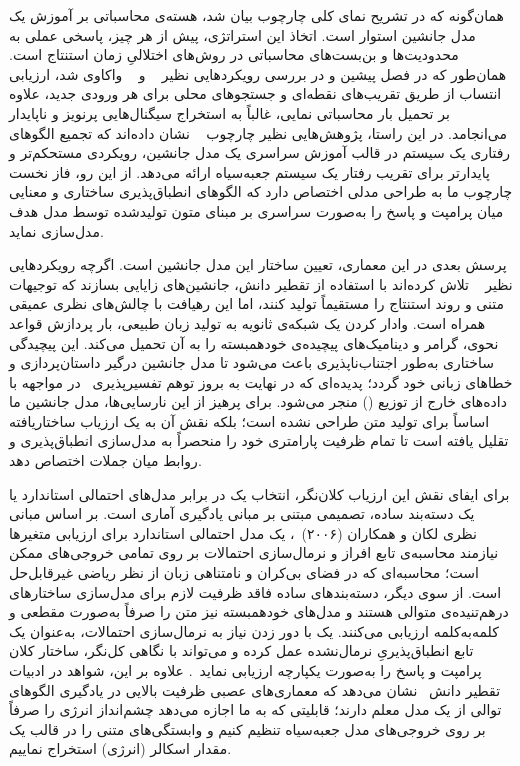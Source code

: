 همان‌گونه که در تشریح نمای کلی چارچوب بیان شد، هسته‌ی محاسباتی  بر آموزش یک مدل جانشین استوار است. اتخاذ این استراتژی، پیش از هر چیز، پاسخی عملی به محدودیت‌ها و بن‌بست‌های محاسباتی در روش‌های اختلالیِ زمان استنتاج است. همان‌طور که در فصل پیشین و در بررسی رویکردهایی نظیر ~\cite{chen2018learning} و ~\cite{seyyedsalehi2024sointer} واکاوی شد، ارزیابی انتساب از طریق تقریب‌های نقطه‌ای و جستجوهای محلی برای هر ورودی جدید، علاوه بر تحمیل بار محاسباتی نمایی، غالباً به استخراج سیگنال‌هایی پرنویز و ناپایدار می‌انجامد. در این راستا، پژوهش‌هایی نظیر چارچوب ~\cite{li2025fromexplainability} نشان داده‌اند که تجمیع الگوهای رفتاری یک سیستم در قالب آموزش سراسری یک مدل جانشین، رویکردی مستحکم‌تر و پایدارتر برای تقریب رفتار یک سیستم جعبه‌سیاه ارائه می‌دهد. از این رو، فاز نخست چارچوب ما به طراحی مدلی اختصاص دارد که الگوهای انطباق‌پذیری ساختاری و معنایی میان پرامپت و پاسخ را به‌صورت سراسری بر مبنای متون تولیدشده توسط مدل هدف مدل‌سازی نماید.

پرسش بعدی در این معماری، تعیین ساختار این مدل جانشین است. اگرچه رویکردهایی نظیر ~\cite{jiang2024trisum} تلاش کرده‌اند با استفاده از تقطیر دانش، جانشین‌های زایایی بسازند که توجیهات متنی و روند استنتاج را مستقیماً تولید کنند، اما این رهیافت با چالش‌های نظری عمیقی همراه است. وادار کردن یک شبکه‌ی ثانویه به تولید زبان طبیعی، بار پردازش قواعد نحوی، گرامر و دینامیک‌های پیچیده‌ی خودهمبسته را به آن تحمیل می‌کند. این پیچیدگی ساختاری به‌طور اجتناب‌ناپذیری باعث می‌شود تا مدل جانشین درگیر داستان‌پردازی و خطاهای زبانی خود گردد؛ پدیده‌ای که در نهایت به بروز توهم تفسیرپذیری~\cite{friedman2024interpretability} در مواجهه با داده‌های خارج از توزیع () منجر می‌شود. برای پرهیز از این نارسایی‌ها، مدل جانشین ما اساساً برای تولید متن طراحی نشده است؛ بلکه نقش آن به یک ارزیاب ساختاریافته تقلیل یافته است تا تمام ظرفیت پارامتری خود را منحصراً به مدل‌سازی انطباق‌پذیری و روابط میان جملات اختصاص دهد.

برای ایفای نقش این ارزیاب کلان‌نگر، انتخاب یک  در برابر مدل‌های احتمالی استاندارد یا یک دسته‌بند ساده، تصمیمی مبتنی بر مبانی یادگیری آماری است. بر اساس مبانی نظری لکان و همکاران (۲۰۰۶)~\cite{lecun2006tutorial}، یک مدل احتمالی استاندارد برای ارزیابی متغیرها نیازمند محاسبه‌ی تابع افراز و نرمال‌سازی احتمالات بر روی تمامی خروجی‌های ممکن است؛ محاسبه‌ای که در فضای بی‌کران و نامتناهی زبان از نظر ریاضی غیرقابل‌حل است. از سوی دیگر، دسته‌بندهای ساده فاقد ظرفیت لازم برای مدل‌سازی ساختارهای درهم‌تنیده‌ی متوالی هستند و مدل‌های خودهمبسته نیز متن را صرفاً به‌صورت مقطعی و کلمه‌به‌کلمه ارزیابی می‌کنند. یک  با دور زدن نیاز به نرمال‌سازی احتمالات، به‌عنوان یک تابع انطباق‌پذیریِ نرمال‌نشده عمل کرده و می‌تواند با نگاهی کل‌نگر، ساختار کلان پرامپت و پاسخ را به‌صورت یکپارچه ارزیابی نماید~\cite{bakhtin2019realfake, deng2020residual, bakhtin2021residual, bhattacharyya2021reranking, qin2022cold, xu2025energybased}. علاوه بر این، شواهد در ادبیات تقطیر دانش~\cite{gu2021fully} نشان می‌دهد که معماری‌های عصبی ظرفیت بالایی در یادگیری الگوهای توالی از یک مدل معلم دارند؛ قابلیتی که به ما اجازه می‌دهد چشم‌انداز انرژی را صرفاً بر روی خروجی‌های مدل جعبه‌سیاه تنظیم کنیم و وابستگی‌های متنی را در قالب یک مقدار اسکالر (انرژی) استخراج نماییم.

